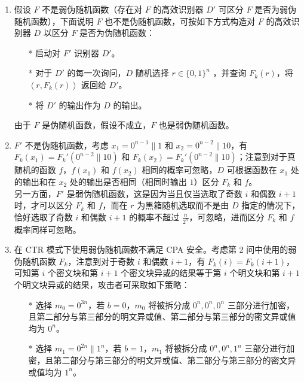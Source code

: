 \begin{questions}
        \begin{solution}
            \begin{enumerate}
                \item 假设 $F$ 不是弱伪随机函数（存在对 $F$ 的高效识别器 $D'$ 可区分 $F$ 是否为弱伪随机函数），下面说明 $F$ 也不是伪随机函数，可按如下方式构造对 $F$ 的高效识别器 $D$ 以区分 $F$ 是否为伪随机函数：
                    \begin{enumerate}
                        \item[*] 启动对 $F'$ 识别器 $D'$。
                        \item[*] 对于 $D'$ 的每一次询问，$D$ 随机选择 $r\in\{0,1\}^n$ ，并查询 $F_k(r)$，将 $\left\langle{r,F_k(r)}\right\rangle$ 返回给 $D'$。
                        \item[*] 将 $D'$ 的输出作为 $D$ 的输出。
                    \end{enumerate}
                    由于 $F$ 是伪随机函数，假设不成立，$F$ 也是弱伪随机函数。
                \item $F'$ 不是伪随机函数，考虑 $x_1=0^{n-1}\parallel1$ 和 $x_2=0^{n-2}\parallel10$，有 $F_k(x_1)=F_k'(0^{n-2}\parallel10)$ 和 $F_k(x_2)=F_k'(0^{n-2}\parallel10)$；注意到对于真随机的函数 $f$，$f(x_1)$ 和 $f(x_2)$ 相同的概率可忽略，$D$ 可根据函数在 $x_1$ 处的输出和在 $x_2$ 处的输出是否相同（相同时输出 $1$）区分 $F_k$ 和 $f$。\\
                另一方面，$F'$ 是弱伪随机函数，这是因为当且仅当选取了奇数 $i$ 和偶数 $i+1$ 时，才可以区分 $F_k$ 和 $f$，而在 $r$ 为黑箱随机选取而不是由 $D$ 指定的情况下，恰好选取了奇数 $i$ 和偶数 $i+1$ 的概率不超过 $\frac{n}{2^n}$，可忽略，进而区分 $F_k$ 和 $f$ 概率同样可忽略。
                \item 在 CTR 模式下使用弱伪随机函数不满足 CPA 安全。考虑第 2 问中使用的弱伪随机函数 $F_k$，注意到对于奇数 $i$ 和偶数 $i+1$，有 $F_k(i)=F_k(i+1)$，可知第 $i$ 个密文块和第 $i+1$ 个密文块异或的结果等于第 $i$ 个明文块和第 $i+1$ 个明文块异或的结果，攻击者可采取如下策略：
                \begin{enumerate}
                    \item[*] 选择 $m_0=0^{3n}$，若 $b=0$，$m_0$ 将被拆分成 $0^n, 0^n, 0^n$ 三部分进行加密，且第二部分与第三部分的明文异或值、第二部分与第三部分的密文异或值均为 $0^n$。
                    \item[*] 选择 $m_1=0^{2n}\parallel1^n$，若 $b=1$，$m_1$ 将被拆分成 $0^n, 0^n, 1^n$ 三部分进行加密，且第二部分与第三部分的明文异或值、第二部分与第三部分的密文异或值均为 $1^n$。
                \end{enumerate}

\end{enumerate}
\end{solution}
\end{questions}
